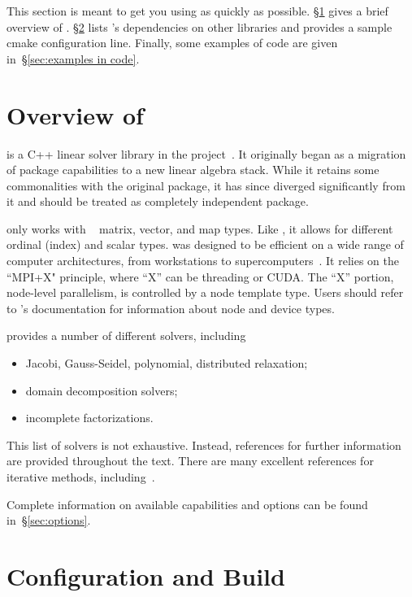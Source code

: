 This section is meant to get you using \ifpacktwo{} as quickly as possible.
\S\ref{sec:overview} gives a brief overview of \ifpacktwo{}.
\S\ref{sec:configuration_and_build} lists \ifpacktwo{}'s dependencies on other
\trilinos{} libraries and provides a sample cmake configuration line. Finally,
some examples of code are given in~\S\ref{sec:examples in code}.

\section{Overview of \ifpacktwo{}}
\label{sec:overview}
\ifpacktwo{} is a C++ linear solver library in the \trilinos{} project~\cite{Heroux2012}.
It originally began as a migration of \ifpack{} package capabilities to a new linear
algebra stack. While it retains some commonalities with the original package, it
has since diverged significantly from it and should be treated as completely
independent package.

\ifpacktwo{} only works with \tpetra{}~\cite{TpetraURL} matrix,
vector, and map types. Like \tpetra{}, it allows for different ordinal
(index) and scalar types. \ifpacktwo{} was designed to be efficient on a wide
range of computer architectures, from workstations to supercomputers~\cite{Lin2014}.
It relies on the ``MPI+X" principle, where ``X'' can be threading or
CUDA\@. The ``X'' portion, node-level parallelism, is controlled by a node
template type. Users should refer to \tpetra{}'s documentation for information
about node and device types.

\ifpacktwo provides a number of different solvers, including
\begin{itemize}
  \item Jacobi, Gauss-Seidel, polynomial, distributed relaxation;
  \item domain decomposition solvers;
  \item incomplete factorizations.
\end{itemize}
This list of solvers is not exhaustive. Instead, references for further
information are provided throughout the text. There are many excellent
references for iterative methods, including~\cite{Saad2003}.

Complete information on available capabilities and options can be found
in~\S\ref{sec:options}.

\section{Configuration and Build}\label{sec:configuration_and_build}

